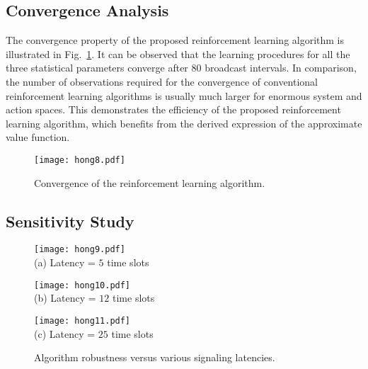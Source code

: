 \subsection{Convergence Analysis}
\label{subsec:converge}
The convergence property of the proposed reinforcement learning algorithm is illustrated in Fig.~\ref{fig:rl_plot}.
It can be observed that the learning procedures for all the three statistical parameters converge after $80$ broadcast intervals.
In comparison, the number of observations required for the convergence of conventional reinforcement learning algorithms is usually much larger for enormous system and action spaces.
This demonstrates the efficiency of the proposed reinforcement learning algorithm, which benefits from the derived expression {of} the approximate value function.
\begin{figure}[ht!]
    \centering
    \texttt{[image: hong8.pdf]}
    \caption{Convergence of the reinforcement learning algorithm.} 
    \label{fig:rl_plot}
\end{figure}

\subsection{Sensitivity Study}
\label{subsec:advance}
\begin{figure*}[ht!]                                                                %
    \centering                                                                      %
    \begin{minipage}[b]{0.30\textwidth}                                             %
        \texttt{[image: hong9.pdf]} \\              %
        (a) Latency = $5$ time slots
    \end{minipage}                                                                  %
    \begin{minipage}[b]{0.30\textwidth}                                             %
        \texttt{[image: hong10.pdf]} \\             %
        (b) Latency = $12$ time slots
    \end{minipage}                                                                  %
    \begin{minipage}[b]{0.30\textwidth}                                             %
        \texttt{[image: hong11.pdf]} \\               %
        (c) Latency = $25$ time slots
    \end{minipage}                                                                  %
    \caption{Algorithm robustness versus various signaling latencies.}                %
    \label{fig:ss_signal}                                                           %
\end{figure*}                                                                       %


